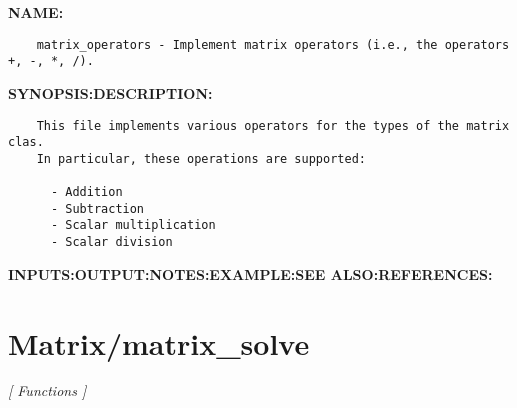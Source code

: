 \label{ch:robo29}
\label{ch:Matrix_matrix_operators}
\textbf{NAME:}\hspace{0.08in}\begin{Verbatim}
    matrix_operators - Implement matrix operators (i.e., the operators +, -, *, /).
\end{Verbatim}
\textbf{SYNOPSIS:}\hspace{0.08in}\textbf{DESCRIPTION:}\hspace{0.08in}\begin{Verbatim}
    This file implements various operators for the types of the matrix clas.
    In particular, these operations are supported:

      - Addition
      - Subtraction
      - Scalar multiplication
      - Scalar division
\end{Verbatim}
\textbf{INPUTS:}\hspace{0.08in}\textbf{OUTPUT:}\hspace{0.08in}\textbf{NOTES:}\hspace{0.08in}\textbf{EXAMPLE:}\hspace{0.08in}\textbf{SEE ALSO:}\hspace{0.08in}\textbf{REFERENCES:}\hspace{0.08in}\section{Matrix/matrix\_solve}
\textsl{[ Functions ]}

